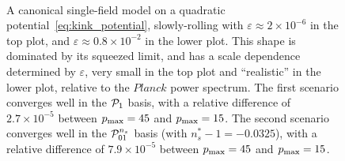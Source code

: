 \begin{figure}[!pth]
\centering
    \\[-2ex]
\caption{
    A canonical single-field model on a quadratic
    potential~\eqref{eq:kink_potential},
    slowly-rolling with $\varepsilon\approx2\times10^{-6}$
    in the top plot, and $\varepsilon\approx0.8\times10^{-2}$
    in the lower plot.
    This shape is dominated by its squeezed limit,
    and has a scale dependence determined by $\varepsilon$,
    very small in the top plot and ``realistic'' in the
    lower plot, relative to the $\textit{Planck}$ power spectrum.
    The first scenario converges well in the $\mathcal{P}_1$ basis,
    with a relative difference of $2.7\times10^{-5}$
    between $p_\text{max}=45$ and $p_\text{max}=15$.
    The second scenario converges well in the $\mathcal{P}^{n_s}_{01}$ basis
    (with $n_s^{*}-1 = -0.0325$),
    with a relative difference of $7.9\times10^{-5}$
    between $p_\text{max}=45$ and $p_\text{max}=15$.
}\label{slice_plot_malda}
\end{figure}


